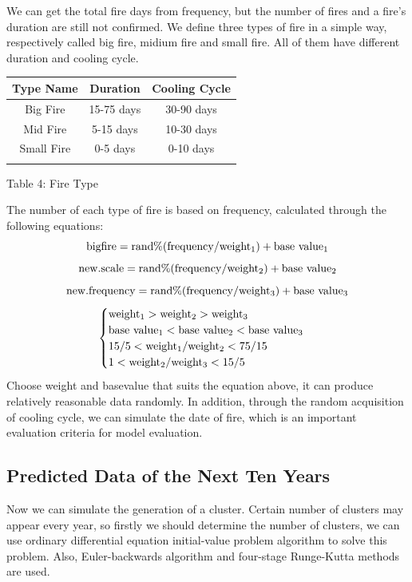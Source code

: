 \documentclass{mcmthesis}
\begin{document}
We can get the total ﬁre days from frequency, but the number of ﬁres and a ﬁre’s duration are still not  confirmed. We define three types of ﬁre in a simple way, respectively called big ﬁre, midium ﬁre and small ﬁre. All of them have different duration and cooling cycle.
  \begin{center}
  	\begin{tabular}{ccc}
  		\hline
  		Type Name & Duration & Cooling Cycle  \\
  		\hline
  		
  		Big Fire & 15-75 days & 30-90 days\\
  		Mid Fire & 5-15 days& 10-30 days\\
  		Small Fire & 0-5 days& 0-10 days\\
  		\hline
  		\label{table:Fire Type}
  	\end{tabular}
  \end{center}
  \begin{center}
  	Table 4: Fire Type
  \end{center}
The number of each type of ﬁre is based on frequency,  calculated through the following equations:
\begin{equation}
	{\rm bigfire} = {\rm rand\%(frequency/weight_1)+base\,\,value_1}
\end{equation}
\begin{equation}
	{\rm new.scale} = {\rm rand\%(frequency/weight_2)+base\,\,value_2}
\end{equation}
\begin{equation}
	{\rm new.frequency} = {\rm rand\%(frequency/weight_3)+base\,\,value_3}
\end{equation}
$$
		\begin{cases}
			{\rm weight_1 > weight_2 > weight_3}  \\
			{\rm base\,\,value_1 < base\,\,value_2 < base\,\,value_3}\\
			{\rm  15/5< weight_1/weight_2 < 75/15} \\
			{\rm  1< weight_2/weight_3 < 15/5} \\
		\end{cases}
$$
Choose weight and basevalue that suits the equation above, it can  produce relatively reasonable data randomly. In addition, through the random acquisition of cooling cycle, we can simulate the date of ﬁre, which is an important evaluation criteria for model evaluation. 

\subsection{Predicted Data of the Next Ten Years}
Now we can simulate the generation of a cluster. Certain number of clusters may appear every year, so ﬁrstly we should determine the number of clusters, we can use ordinary diﬀerential equation initial-value problem algorithm to solve this problem. Also, Euler-backwards algorithm and four-stage Runge-Kutta methods are used.\cite{878915}
\end{document}
